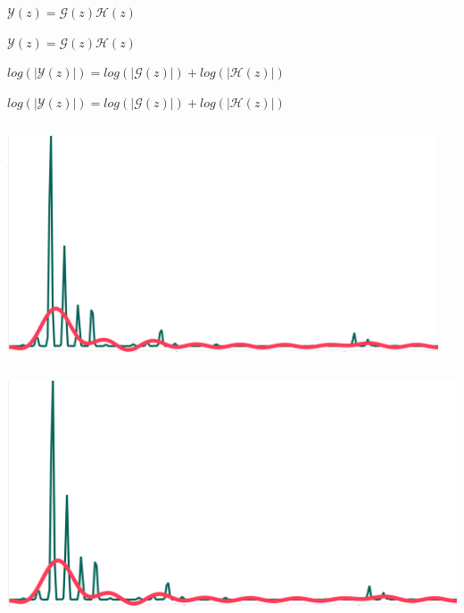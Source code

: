 \documentclass[9pt]{beamer}
\begin{document}
\begin{frame}[t]
    \begin{itemize}
         {
            \item[$\ $] $\mathcal{Y}(z) = \mathcal{G}(z) \mathcal{H}(z)$
        }
         {
            \item[$\ $] $\mathcal{Y}(z) = \mathcal{G}(z) \mathcal{H}(z)$
        }
         { \item $log(|\mathcal{Y}(z)|) = log(|\mathcal{G}(z)|) + log(|\mathcal{H}(z)|)$
        }
         {
            \item $log(|\mathcal{Y}(z)|) = log(|\mathcal{G}(z)|) + log(|\mathcal{H}(z)|)$
        }
         {
            \begin{columns}
                \begin{column}{0.48\textwidth}
                     \includegraphics[width=\textwidth]{aaaa.png}
                \end{column}
                \pause
                \hfill
                \begin{column}{0.48\textwidth}
                \end{column}
            \end{columns}
        }
         {
                \begin{columns}
                    \begin{column}{0.48\textwidth}
                         \includegraphics[width=\textwidth]{aaaa.png}

\end{column}
\end{columns}}
\end{itemize}
\end{frame}
\end{document}
